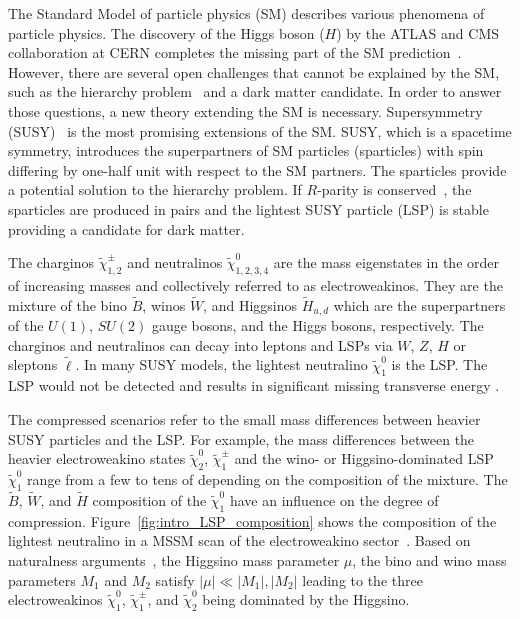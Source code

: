 The Standard Model of particle physics (SM) describes various phenomena of particle physics.
The discovery of the Higgs boson ($H$) by the ATLAS and CMS collaboration at CERN completes the missing part of the SM prediction~\cite{Aad:2012tfa, Chatrchyan:2012xdj}.
However, there are several open challenges that cannot be explained by the SM, such as the hierarchy problem~\cite{Weinberg:1975gm, Gildener:1976ai, Susskind:1978ms} and a dark matter candidate.
In order to answer those questions, a new theory extending the SM is necessary.
Supersymmetry (SUSY)~\cite{Wess:1973kz, Wess:1974tw, Golfand:1971iw, Martin:1997ns} is the most promising extensions of the SM.
SUSY, which is a spacetime symmetry, introduces the superpartners of SM particles (sparticles) with spin differing by one-half unit with respect to the SM partners.
The sparticles provide a potential solution to the hierarchy problem.
If $R$-parity is conserved~\cite{Fayet:1976et, Fayet:1977yc, Farrar:1978xj}, the sparticles are produced in pairs and the lightest SUSY particle (LSP) is stable providing a candidate for dark matter.

The charginos $\widetilde{\chi}^{\pm}_{1,2}$ and neutralinos $\widetilde{\chi}^{0}_{1,2,3,4}$ are the mass eigenstates in the order of increasing masses and collectively referred to as electroweakinos.
They are the mixture of the bino $\widetilde{B}$, winos $\widetilde{W}$, and Higgsinos $\widetilde{H}_{u,d}$ which are the superpartners of the $U(1)$, $SU(2)$ gauge bosons, and the Higgs bosons, respectively.
The charginos and neutralinos can decay into leptons and LSPs via $W$, $Z$, $H$ or sleptons $\widetilde{\ell}$.
In many SUSY models, the lightest neutralino $\widetilde{\chi}^{0}_{1}$ is the LSP.
The LSP would not be detected and results in significant missing transverse energy \MET.

The compressed scenarios refer to the small mass differences between heavier SUSY particles and the LSP.
For example, the mass differences between the heavier electroweakino states $\widetilde{\chi}^{0}_{2}$, $\widetilde{\chi}^{\pm}_{1}$ and the wino- or Higgsino-dominated LSP $\widetilde{\chi}^{0}_{1}$ range from a few {\MeV} to tens of {\GeV} depending on the composition of the mixture.
The $\widetilde{B}$, $\widetilde{W}$, and $\widetilde{H}$ composition of the $\widetilde{\chi}^{0}_{1}$ have an influence on the degree of compression.
Figure~\ref{fig:intro_LSP_composition} shows the composition of the lightest neutralino in a MSSM scan of the electroweakino sector~\cite{Aaboud:2016wna}.
Based on naturalness arguments~\cite{Barbieri:1987fn, deCarlos:1993rbr}, the Higgsino mass parameter $\mu$, the bino and wino mass parameters $M_{1}$ and $M_{2}$ satisfy $|\mu| \ll |M_{1}|, |M_{2}|$ leading to the three electroweakinos $\widetilde{\chi}^{0}_{1}$, $\widetilde{\chi}^{\pm}_{1}$, and $\widetilde{\chi}^{0}_{2}$ being dominated by the Higgsino.

